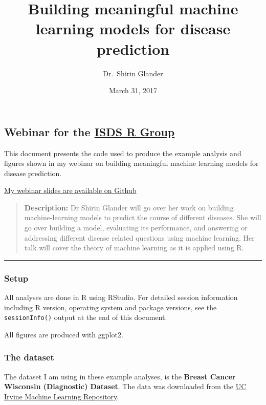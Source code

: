 \documentclass[]{article}
\title{Building meaningful machine learning models for disease prediction}
\author{Dr.~Shirin Glander}
\date{March 31, 2017}
\begin{document}
\maketitle

\subsection{\texorpdfstring{Webinar for the
\href{http://www.syndromic.org/cop/r}{ISDS R
Group}}{Webinar for the ISDS R Group}}\label{webinar-for-the-isds-r-group}

This document presents the code used to produce the example analysis and
figures shown in my webinar on building meaningful machine learning
models for disease prediction.

\href{https://github.com/ShirinG/Webinar_ML_for_disease}{My webinar
slides are available on Github}

\begin{quote}
\textbf{Description:} Dr Shirin Glander will go over her work on
building machine-learning models to predict the course of different
diseases. She will go over building a model, evaluating its performance,
and answering or addressing different disease related questions using
machine learning. Her talk will cover the theory of machine learning as
it is applied using R.
\end{quote}

\begin{center}\rule{0.5\linewidth}{\linethickness}\end{center}

\subsubsection{Setup}\label{setup}

All analyses are done in R using RStudio. For detailed session
information including R version, operating system and package versions,
see the \texttt{sessionInfo()} output at the end of this document.

All figures are produced with ggplot2.

\subsubsection{The dataset}\label{the-dataset}

The dataset I am using in these example analyses, is the \textbf{Breast
Cancer Wisconsin (Diagnostic) Dataset}. The data was downloaded from the
\href{http://archive.ics.uci.edu/ml/datasets/Breast+Cancer+Wisconsin+\%28Diagnostic\%29}{UC
Irvine Machine Learning Repository}.
\end{document}

